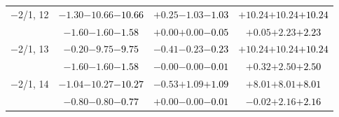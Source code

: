 \documentclass[compress]{beamer}
\begin{document}
\begin{frame}
\begin{tabular}{r | c | c | c}
$-$2/1, 12 & $-1.30$\hspace{0.1 cm}$-10.66$\hspace{0.1 cm}\textcolor{black}{$-10.66$} & $+0.25$\hspace{0.1 cm}$-1.03$\hspace{0.1 cm}\textcolor{black}{$-1.03$} & $+10.24$\hspace{0.1 cm}$+10.24$\hspace{0.1 cm}\textcolor{black}{$+10.24$} \\
           & $-1.60$\hspace{0.1 cm}$-1.60$\hspace{0.1 cm}\textcolor{black}{$-1.58$} & $+0.00$\hspace{0.1 cm}$+0.00$\hspace{0.1 cm}\textcolor{black}{$-0.05$} & $+0.05$\hspace{0.1 cm}$+2.23$\hspace{0.1 cm}\textcolor{black}{$+2.23$} \\
$-$2/1, 13 & $-0.20$\hspace{0.1 cm}$-9.75$\hspace{0.1 cm}\textcolor{black}{$-9.75$} & $-0.41$\hspace{0.1 cm}$-0.23$\hspace{0.1 cm}\textcolor{black}{$-0.23$} & $+10.24$\hspace{0.1 cm}$+10.24$\hspace{0.1 cm}\textcolor{black}{$+10.24$} \\
           & $-1.60$\hspace{0.1 cm}$-1.60$\hspace{0.1 cm}\textcolor{black}{$-1.58$} & $-0.00$\hspace{0.1 cm}$-0.00$\hspace{0.1 cm}\textcolor{black}{$-0.01$} & $+0.32$\hspace{0.1 cm}$+2.50$\hspace{0.1 cm}\textcolor{black}{$+2.50$} \\
$-$2/1, 14 & $-1.04$\hspace{0.1 cm}$-10.27$\hspace{0.1 cm}\textcolor{black}{$-10.27$} & $-0.53$\hspace{0.1 cm}$+1.09$\hspace{0.1 cm}\textcolor{black}{$+1.09$} & $+8.01$\hspace{0.1 cm}$+8.01$\hspace{0.1 cm}\textcolor{black}{$+8.01$} \\
           & $-0.80$\hspace{0.1 cm}$-0.80$\hspace{0.1 cm}\textcolor{black}{$-0.77$} & $+0.00$\hspace{0.1 cm}$-0.00$\hspace{0.1 cm}\textcolor{black}{$-0.01$} & $-0.02$\hspace{0.1 cm}$+2.16$\hspace{0.1 cm}\textcolor{black}{$+2.16$} \\

\end{tabular}
\end{frame}
\end{document}
